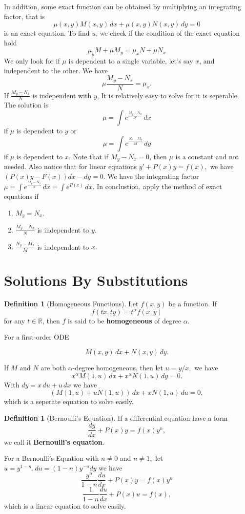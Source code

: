 \documentclass[12pt,a4paper]{report}
\theoremstyle{definition}
\newtheorem{definition}[theorem]{Definition}
\theoremstyle{remark}
\newcommand{\R}{\mathbb{R}}
\begin{document}
In addition, some exact function can be obtained by multiplying an integrating factor, that is 
\[\mu(x, y)M(x, y) \, dx + \mu(x, y)N(x, y) \, dy = 0\]
is an exact equation. To find $u$, we check if the condition of the exact equation hold
\[\mu_y M+\mu M_y = \mu_x N + \mu N_x\]
We only look for if $\mu$ is dependent to a single variable, let's say $x$, and independent to the other. We have
\[\mu \frac{M_y - N_x}{N} = \mu_x.\] 
If $\displaystyle\frac{M_y - N_x}{N}$ is independent with $y$, It is relatively easy to solve for it is seperable. The solution is
\[\mu = \int e^\frac{M_y - N_x}{N} \, dx\]
if $\mu$ is dependent to $y$ or 
\[\mu = \int e^\frac{N_x - M_y}{M} \, dy\]
if $\mu$ is dependent to $x$.
Note that if $M_y - N_x = 0$, then $\mu$ is a constant and not needed. Also notice that for linear equations $y' + P(x)y = f(x),$ we have $(P(x)y - F(x))dx - dy = 0.$ We have the integrating factor $\mu = \displaystyle\int e^\frac{M_y - N_x}{N} \, dx = \displaystyle\int e^{P(x)} \, dx.$
In conclustion, apply the method of exact equations if
\begin{enumerate}
    \item $M_y = N_x.$
    \item $\displaystyle\frac{M_y - N_x}{N}$ is independent to $y.$
    \item $\displaystyle\frac{N_y - M_x}{M}$ is independent to $x.$
\end{enumerate}

\section{Solutions By Substitutions}

\begin{definition}[Homogeneous Functions]
    Let $f(x, y)$ be a function. If 
    \[f(tx, ty) = t^\alpha f(x, y)\]
    for any $t \in \R$, then $f$ is said to be \textbf{homogeneous} of degree $\alpha.$
\end{definition}

For a first-order ODE

\[M(x, y) \, dx + N(x, y) \, dy.\]

If $M$ and $N$ are both $\alpha$-degree homogeneous, then let $u = y/x,$ we have 
\[x^\alpha M(1, u) \, dx+ x^\alpha N(1, u) \, dy = 0.\]
With $dy = x\,du + u\,dx$ we have
\[(M(1, u) + uN(1, u)) \, dx + xN(1, u)\,du = 0,\]
which is a seperate equation to solve easily.

\begin{definition}[Bernoulli's Equation]
    If a differential equation have a form
    \[\frac{dy}{dx} + P(x)y = f(x)y^n,\]
    we call it \textbf{Bernoulli's equation}.
\end{definition}
For a Bernoulli's Equation with $n \neq 0$ and $n \neq 1,$ let $u = y^{1 - n}, du = (1 - n)y^{-n}dy$ we have 
\[\frac{y^n}{1 - n}\frac{du}{dx} + P(x)y = f(x)y^n\]
\[\frac{1}{1 - n}\frac{du}{dx} + P(x)u = f(x),\]
which is a linear equation to solve easily.
\end{document}
